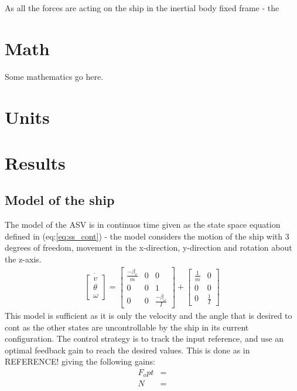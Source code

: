\documentclass{ifacconf}
\begin{document}
As all the forces are acting on the ship in the inertial body fixed frame - the 

\section{Math}
Some mathematics go here. 

\section{Units}

\section{Results}

\subsection{Model of the ship}
The model of the ASV is in continuos time given as the state space equation defined in (eq:\ref{eq:ss_cont}) - the model considers the motion of the ship with 3 degrees of freedom, movement in the x-direction, y-direction and rotation about the z-axis. 
\begin{align}
\dot{\begin{bmatrix}
v\\
\theta\\
\omega
\end{bmatrix}} = \begin{bmatrix}
\frac{-\beta_v}{m} & 0 & 0\\
0 & 0 & 1\\
0 & 0 & \frac{-\beta_\omega}{I}
\end{bmatrix} + \begin{bmatrix}
\frac{1}{m} & 0\\
0 & 0\\
0 & \frac{1}{I}
\end{bmatrix}
\label{eq:ss_cont}
\end{align}
This model is sufficient as it is only the velocity and the angle that is desired to cont as the other states are uncontrollable by the ship in its current configuration. The control strategy is to track the input reference, and use an optimal feedback gain to reach the desired values. This is done as in REFERENCE! giving the following gains:
\begin{align}
F_opt &= \\
N &= 
\end{align}
\end{document}
